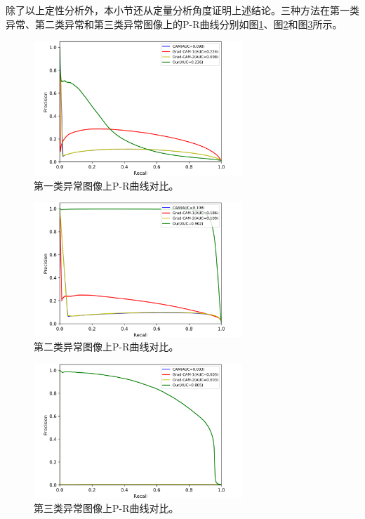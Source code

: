 除了以上定性分析外，本小节还从定量分析角度证明上述结论。三种方法在第一类异常、第二类异常和第三类异常图像上的P-R曲线分别如图\ref{fig:multi_simulate_pr_curve_image_net}、图\ref{fig:multi_simulate_pr_curve_skin}和图\ref{fig:multi_simulate_pr_curve_circle}所示。
\begin{figure}[H]
	\centering
	\includegraphics[width=0.7\textwidth]{figure/pr_curve_multi_skin/IMAGE_NET_pr_curve.png}
	\caption[第一类异常图像上P-R曲线对比]{第一类异常图像上P-R曲线对比。} 
	\label{fig:multi_simulate_pr_curve_image_net}
\end{figure}
\begin{figure}[H]
	\centering
	\includegraphics[width=0.7\textwidth]{figure/pr_curve_multi_skin/SKIN_pr_curve.png}
	\caption[第二类异常图像上P-R曲线对比]{第二类异常图像上P-R曲线对比。} 
	\label{fig:multi_simulate_pr_curve_skin}
\end{figure}
\begin{figure}[H]
	\centering
	\includegraphics[width=0.7\textwidth]{figure/pr_curve_multi_skin/CIRCLE_pr_curve.png}
	\caption[第三类异常图像上P-R曲线对比]{第三类异常图像上P-R曲线对比。}
	\label{fig:multi_simulate_pr_curve_circle}
\end{figure}

